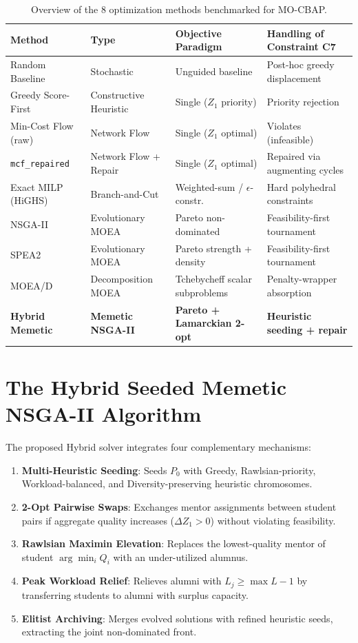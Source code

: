 \documentclass[11pt,a4paper,oneside]{report}
\begin{document}
\begin{table}[htbp]
\centering
\caption{Overview of the 8 optimization methods benchmarked for MO-CBAP.}
\label{tab:alg_comparison}
\begin{tabularx}{\textwidth}{llll}
\toprule
\textbf{Method} & \textbf{Type} & \textbf{Objective Paradigm} & \textbf{Handling of Constraint C7} \\
\midrule
Random Baseline & Stochastic & Unguided baseline & Post-hoc greedy displacement \\
Greedy Score-First & Constructive Heuristic & Single ($Z_1$ priority) & Priority rejection \\
Min-Cost Flow (raw) & Network Flow & Single ($Z_1$ optimal) & Violates (infeasible) \\
\texttt{mcf\_repaired} & Network Flow + Repair & Single ($Z_1$ optimal) & Repaired via augmenting cycles \\
Exact MILP (HiGHS) & Branch-and-Cut & Weighted-sum / $\epsilon$-constr. & Hard polyhedral constraints \\
NSGA-II & Evolutionary MOEA & Pareto non-dominated & Feasibility-first tournament \\
SPEA2 & Evolutionary MOEA & Pareto strength + density & Feasibility-first tournament \\
MOEA/D & Decomposition MOEA & Tchebycheff scalar subproblems & Penalty-wrapper absorption \\
\textbf{Hybrid Memetic} & \textbf{Memetic NSGA-II} & \textbf{Pareto + Lamarckian 2-opt} & \textbf{Heuristic seeding + repair} \\
\bottomrule
\end{tabularx}
\end{table}

\section{The Hybrid Seeded Memetic NSGA-II Algorithm}
The proposed Hybrid solver integrates four complementary mechanisms:
\begin{enumerate}
    \item \textbf{Multi-Heuristic Seeding}: Seeds $P_0$ with Greedy, Rawlsian-priority, Workload-balanced, and Diversity-preserving heuristic chromosomes.
    \item \textbf{2-Opt Pairwise Swaps}: Exchanges mentor assignments between student pairs if aggregate quality increases ($\Delta Z_1 > 0$) without violating feasibility.
    \item \textbf{Rawlsian Maximin Elevation}: Replaces the lowest-quality mentor of student $\arg\min_i Q_i$ with an under-utilized alumnus.
    \item \textbf{Peak Workload Relief}: Relieves alumni with $L_j \ge \max L - 1$ by transferring students to alumni with surplus capacity.
    \item \textbf{Elitist Archiving}: Merges evolved solutions with refined heuristic seeds, extracting the joint non-dominated front.
\end{enumerate}
\end{document}
